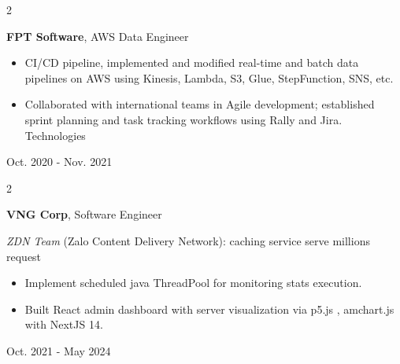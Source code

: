 \documentclass[10pt, letterpaper]{article}
\newenvironment{highlights}{
	\begin{itemize}[
		topsep=0.10 cm,
		parsep=0.10 cm,
		partopsep=0pt,
		itemsep=0pt,
		leftmargin=0.4 cm + 10pt
		]
	}{
	\end{itemize}
} %
\newenvironment{twocolentry}[2][]{
	\onecolentry
	\def\secondColumn{#2}
	\setcolumnwidth{\fill, 4.5 cm}
	\begin{paracol}{2}
	}{
		\switchcolumn \raggedleft \secondColumn
	\end{paracol}
	\endonecolentry
} %
\let\hrefWithoutArrow\href
\renewcommand{\href}[2]{\hrefWithoutArrow{#1}{\ifthenelse{\equal{#2}{}}{ }{#2 }\raisebox{.15ex}{\footnotesize \faExternalLink*}}}
\begin{document}
	\begin{twocolentry}{Oct. 2020 - Nov. 2021}
		\textbf{FPT Software}, AWS Data Engineer
		
		\begin{highlights}
			\item CI/CD pipeline, implemented and modified real-time and batch data pipelines on AWS using Kinesis, Lambda, S3, Glue, StepFunction, SNS, etc.
			\item Collaborated with international teams in Agile development; established sprint planning and task tracking workflows using Rally and Jira.
			Technologies
			
			
		\end{highlights}
		
		
	\end{twocolentry}
	
	\vspace{0.2 cm}
	
	\begin{twocolentry}{Oct. 2021 - May 2024}
		\textbf{VNG Corp}, Software Engineer
		
		\textit{ZDN Team} (Zalo Content Delivery Network): caching service serve millions request
		\begin{highlights}
			\item Implement scheduled java ThreadPool for monitoring stats execution.
			\item Built React admin dashboard with server visualization via p5.js , amchart.js with NextJS 14.
		\end{highlights}
	\end{twocolentry}
	
\end{document}
